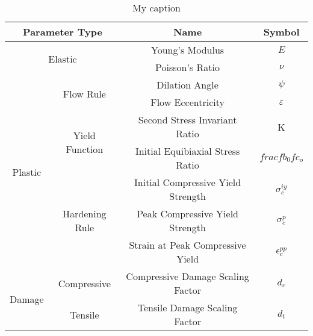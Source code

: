 \begin{table}[]
\centering
\caption{My caption}
\label{my-label}
\begin{tabular}{cccc}
\hline
\multicolumn{2}{c}{Parameter Type}                         & Name                               & Symbol             \\ \hline
\multicolumn{2}{c}{\multirow{2}{*}{Elastic}}               & Young's Modulus                    & $E$                \\
\multicolumn{2}{c}{}                                       & Poisson's Ratio                    & $\nu$              \\ \cline{1-2}
\multirow{7}{*}{Plastic} & \multirow{2}{*}{Flow Rule}      & Dilation Angle                     & $\psi$             \\
                         &                                 & Flow Eccentricity                  & $\varepsilon$      \\ \cline{2-2}
                         & \multirow{2}{*}{Yield Function} & Second Stress Invariant Ratio      & K                  \\
                         &                                 & Initial Equibiaxial Stress Ratio   & $frac{fb_0}{fc_o}$ \\ \cline{2-2}
                         & \multirow{3}{*}{Hardening Rule} & Initial Compressive Yield Strength & $\sigma_c^{iy}$    \\
                         &                                 & Peak Compressive Yield Strength    & $\sigma_c^{p}$     \\
                         &                                 & Strain at Peak Compressive Yield   & $\epsilon_c^{pp}$  \\ \cline{1-2}
\multirow{2}{*}{Damage}  & Compressive                     & Compressive Damage Scaling Factor  & $d_c$              \\ \cline{2-2}
                         & Tensile                         & Tensile Damage Scaling Factor      & $d_t$             
\end{tabular}
\end{table}